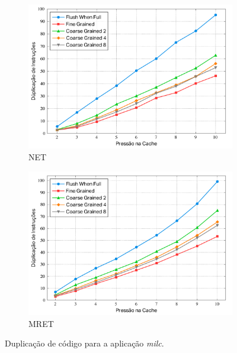 \documentclass[12pt,twoside]{article}
\begin{document}
\begin{figure}[!ht]
        \centering
        \begin{subfigure}[b]{0.45\textwidth}
                \includegraphics[width=\textwidth]{./figs/net-milc-duplication}
                \caption{NET}
        \end{subfigure}
        \quad 
                \begin{subfigure}[b]{0.45\textwidth}
                \includegraphics[width=\textwidth]{./figs/mret-milc-duplication}
                \caption{MRET}
        \end{subfigure}
\caption{Duplicação de código para a aplicação \emph{milc}.}
\label{fig-duplic}
\end{figure}
\end{document}
